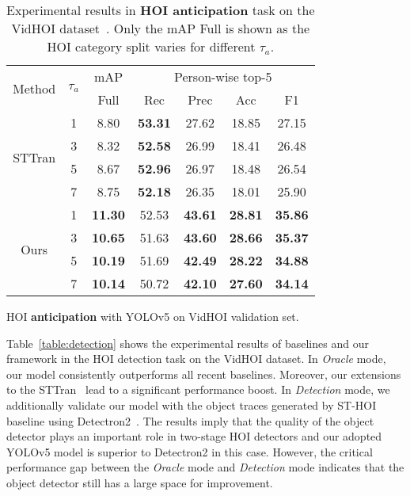 \documentclass[times,twocolumn,final,authoryear]{elsarticle}
\begin{document}
\begin{table}
    \begin{subtable}[]{0.47\textwidth}
        \centering
        \small
        \begin{tabular}{|c|c|c|c c c c|}
            \hline
            \multirow{2}{*}{Method} & \multirow{2}{*}{$\tau_a$} & mAP & \multicolumn{4}{c|}{Person-wise top-5} \\
            \cline{3-7}
            & & Full & Rec & Prec & Acc & F1 \\
            \hline
            \multirow{4}{*}{STTran} & 1 & 8.80 & \textbf{53.31} & 27.62 & 18.85 & 27.15\\
            & 3 & 8.32 & \textbf{52.58} & 26.99 & 18.41 & 26.48\\
            & 5 & 8.67 & \textbf{52.96} & 26.97 & 18.48 & 26.54\\
            & 7 & 8.75 & \textbf{52.18} & 26.35 & 18.01 & 25.90\\
            \hline
            \multirow{4}{*}{Ours} & 1 & \textbf{11.30} & 52.53 & \textbf{43.61} & \textbf{28.81} & \textbf{35.86}\\
            & 3 & \textbf{10.65} & 51.63 & \textbf{43.60} & \textbf{28.66} & \textbf{35.37}\\
            & 5 & \textbf{10.19} & 51.69 & \textbf{42.49} & \textbf{28.22} & \textbf{34.88}\\
            & 7 & \textbf{10.14} & 50.72 & \textbf{42.10} & \textbf{27.60} & \textbf{34.14}\\
            \hline
        \end{tabular}
        \caption{HOI \textbf{anticipation} with YOLOv5 on VidHOI validation set.}
        \label{table:anticipation_det}
    \end{subtable}

    \caption{Experimental results in \textbf{HOI anticipation} task on the VidHOI dataset~\citep{hoi_v_set:VidHOI}. Only the mAP Full is shown as the HOI category split varies for different $\tau_a$. }
    \label{table:anticipation}
\end{table}

Table~\ref{table:detection} shows the experimental results of baselines and our framework in the HOI detection task on the VidHOI dataset. In \emph{Oracle} mode, our model consistently outperforms all recent baselines. Moreover, our extensions to the STTran~\citep{hoi_v2:sttran} lead to a significant performance boost. In \emph{Detection} mode, we additionally validate our model with the object traces generated by ST-HOI baseline using Detectron2~\citep{detection:detectron2}. The results imply that the quality of the object detector plays an important role in two-stage HOI detectors and our adopted YOLOv5 model is superior to Detectron2 in this case. However, the critical performance gap between the \textit{Oracle} mode and \textit{Detection} mode indicates that the object detector still has a large space for improvement.
\end{document}

